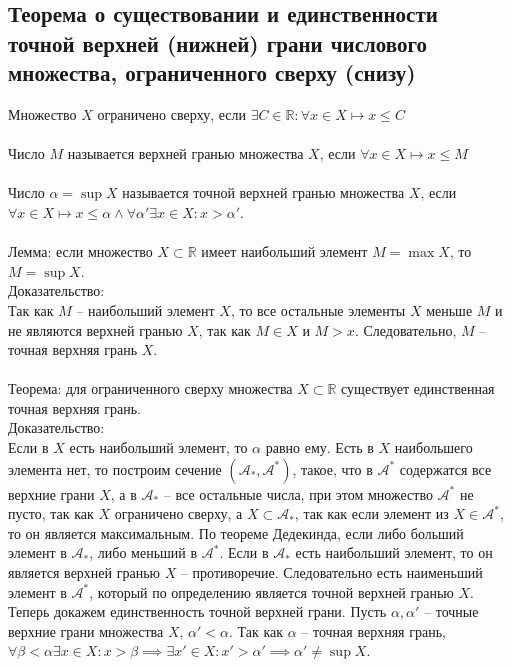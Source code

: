 \documentclass{article}
\begin{document}
        
    \subsection*{Теорема  о  существовании  и  единственности точной верхней (нижней) грани числового множества, ограниченного сверху (снизу)}
        Множество $X$ ограничено сверху, если $\exists C \in \mathbb{R}: \forall x \in X \longmapsto x \le C$
        \\
        \\
        Число $M$ называется верхней гранью множества $X$, если $\forall x \in X \longmapsto x \le M$
        \\
        \\
        Число $\alpha = \sup X$ называется точной верхней гранью множества $X$, если $\forall x \in X \longmapsto x \le \alpha \wedge \forall \alpha' \exists x \in X: x > \alpha'$.
        \\
        \\
        Лемма: если множество $X \subset \mathbb{R}$ имеет наибольший элемент $M = \max X$, то $M = \sup X$.
        \\
        Доказательство:
        \\
        Так как $M$ -- наибольший элемент $X$, то все остальные элементы $X$ меньше $M$ и не являются верхней гранью $X$, так как
        $M \in X$ и $M > x$. Следовательно, $M$ -- точная верхняя грань $X$.
        \\
        \\
        Теорема: для ограниченного сверху множества $X \subset \mathbb{R}$ существует единственная точная верхняя грань.
        \\
        Доказательство:
        \\
        Если в $X$ есть наибольший элемент, то $\alpha$ равно ему.
        Есть в $X$ наибольшего элемента нет, то построим сечение $(\mathcal{A_*}, \mathcal{A^*})$, такое, что в $\mathcal{A^*}$ содержатся все верхние грани $X$,
        а в $\mathcal{A_*}$ -- все остальные числа, при этом множество $\mathcal{A^*}$ не пусто, так как $X$ ограничено сверху,
        а $X \subset \mathcal{A_*}$, так как если элемент из $X \in \mathcal{A^*}$, то он является максимальным.
        По теореме Дедекинда, если либо больший элемент в $\mathcal{A_*}$, либо меньший в $\mathcal{A^*}$.
        Если в $\mathcal{A_*}$ есть наибольший элемент, то он является верхней гранью $X$ -- противоречие. Следовательно есть наименьший элемент в $\mathcal{A^*}$,
        который по определению является точной верхней гранью $X$.
        \\
        Теперь докажем единственность точной верхней грани.
        Пусть $\alpha, \alpha'$ -- точные верхние грани множества $X$, $\alpha' < \alpha$. Так как $\alpha$ -- точная верхняя грань,
        $\forall \beta < \alpha \exists x \in X: x > \beta \implies \exists x' \in X: x' > {\alpha'} \implies \alpha' \neq \sup X$.
        
\end{document}
